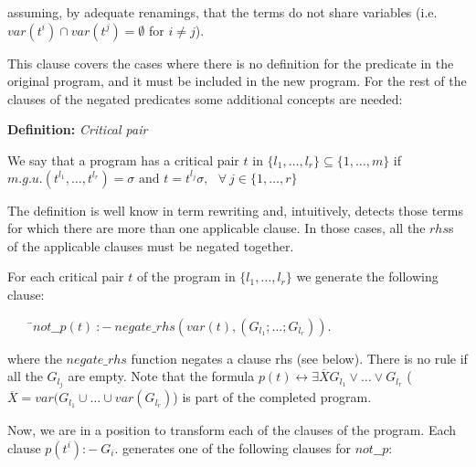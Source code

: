 \documentclass[]{llncs}
\newenvironment{mytabbing}
   {\vspace{0.3em}\begin{small}\begin{tabbing}}
   {\end{tabbing}\end{small}\vspace{0.3em}}
\begin{document}

\noindent
assuming, by adequate renamings, that the terms do not share variables
(i.e. $var (t^i) \cap var (t^j) = \emptyset$ for $i \neq j$).

This clause covers the cases where there is no definition for the
predicate in the original program,
and it must be included in the new program.
For the rest of the clauses of the negated predicates some additional
concepts are needed:

\medskip
\noindent
{\bf Definition:} {\em Critical pair}

\noindent
We say that a program has a critical pair $t$ in
$\{l_1, \ldots, l_r\} \subseteq \{1, \ldots, m\}$ if
$m.g.u. (t^{l_1}, \ldots, t^{l_r}) = \sigma \mbox{ and }
t = t^{l_j}\sigma, ~~~\forall~ j \in \{1, \ldots,r\}$


\smallskip
The definition is well know in term rewriting and, intuitively,
detects those terms for which there are more than one 
applicable clause. In those cases, all the $rhs$s of the applicable
clauses must be negated together.

For each critical pair $t$ of the
program in $\{l_1, \ldots, l_r\}$ we generate the following clause:

\begin{mytabbing}
~~~~\=$not\_\_p (t) ~:-
           ~negate\_rhs (var (t), (G_{l_1}; \ldots; G_{l_r})).$ 
\end{mytabbing}

\noindent
where the $negate\_rhs$ function negates a clause rhs (see below).
There is no rule if all the $G_{l_j}$ are empty.
Note that the formula
$p (t) \longleftrightarrow \exists \overline{X} G_{l_1} \vee \ldots \vee G_{l_r}
$ ($\overline{X} = var(G_{l_1} \cup \ldots \cup var(G_{l_r})$) is
part of the completed program.

Now, we are in a position to transform each of the clauses of
the program. Each clause $p (t^i) :- ~G_i$.
generates one of the following clauses for $not\_\_p$:
\end{document}
